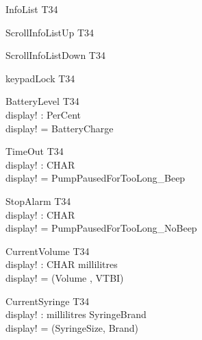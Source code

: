 \documentclass[landscape]{article}
\begin{document}
\begin{schema} {InfoList}
\Xi T34
\end{schema}

\begin{schema} {ScrollInfoListUp}
\Xi T34
\end{schema}

\begin{schema} {ScrollInfoListDown}
\Xi T34
\end{schema}

\begin{schema} {keypadLock}
\Xi T34
\end{schema}

\begin{schema} {BatteryLevel}
\Xi T34\\
display! : PerCent\\
\where
display! = BatteryCharge\\
\end{schema}

\begin{schema} {TimeOut}
\Xi T34\\
display! : CHAR\\
\where
display! = PumpPausedForTooLong\_Beep\\
\end{schema}

\begin{schema} {StopAlarm}
\Xi T34\\
display! : CHAR\\
\where
display! = PumpPausedForTooLong\_NoBeep\\
\end{schema}

\begin{schema} {CurrentVolume}
\Xi T34\\
display! :  CHAR \cross millilitres\\
\where
display! = (Volume , VTBI)
\end{schema}

\begin{schema}{CurrentSyringe}
\Xi T34\\
display! : millilitres \cross SyringeBrand\\
\where
display! = (SyringeSize, Brand)\\
\end{schema}
\end{document}
